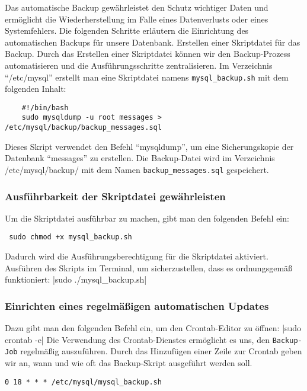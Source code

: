 Das automatische Backup gewährleistet den Schutz wichtiger Daten und ermöglicht die Wiederherstellung im Falle eines Datenverlusts oder eines Systemfehlers. Die folgenden Schritte erläutern die Einrichtung des automatischen Backups für unsere Datenbank.
Erstellen einer Skriptdatei für das Backup.
Durch das Erstellen einer Skriptdatei können wir den Backup-Prozess automatisieren und die Ausführungsschritte zentralisieren.
Im Verzeichnis \enquote{/etc/mysql} erstellt man eine Skriptdatei namens \verb+mysql_backup.sh+ mit dem folgenden Inhalt:

\begin{verbatim}
    #!/bin/bash
    sudo mysqldump -u root messages > /etc/mysql/backup/backup_messages.sql
\end{verbatim}

Dieses Skript verwendet den Befehl \enquote{mysqldump}, um eine Sicherungskopie der Datenbank \enquote{messages} zu erstellen. 
Die Backup-Datei wird im Verzeichnis /etc/mysql/backup/ mit dem Namen \verb+backup_messages.sql+ gespeichert.

\subsubsection*{Ausführbarkeit der Skriptdatei gewährleisten}

Um die Skriptdatei ausführbar zu machen, gibt man den folgenden Befehl ein:
\begin{verbatim} sudo chmod +x mysql_backup.sh \end{verbatim}
Dadurch wird die Ausführungsberechtigung für die Skriptdatei aktiviert.
Ausführen des Skripts im Terminal, um sicherzustellen, dass es ordnungsgemäß funktioniert:
|sudo ./mysql_backup.sh|

\subsubsection*{Einrichten eines regelmäßigen automatischen Updates}

Dazu gibt man den folgenden Befehl ein, um den Crontab-Editor zu öffnen:
|sudo crontab -e|
Die Verwendung des Crontab-Dienstes ermöglicht es uns, den \verb+Backup-Job+ regelmäßig auszuführen. Durch das Hinzufügen einer Zeile zur Crontab geben wir an, wann und wie oft das Backup-Skript ausgeführt werden soll. 

\begin{verbatim}0 18 * * * /etc/mysql/mysql_backup.sh\end{verbatim}

